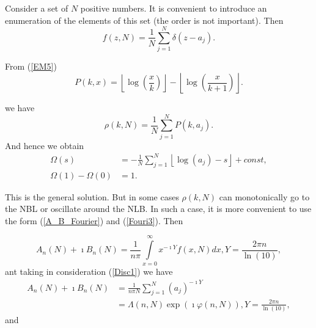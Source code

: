 \documentclass[titlepage,fleqn]{article}%
\begin{document}
Consider a set of $N$ positive numbers. It is convenient to introduce an
enumeration of the elements of this set (the order is not important). Then%
\begin{equation}
f(z,N)=\frac{1}{N}%
{\displaystyle\sum\limits_{j=1}^{N}}
\delta\left(  z-a_{j}\right)  . \label{Disc1}%
\end{equation}


From (\ref{EM5})%
\begin{equation}
P(k,x)=\left\lfloor \log\left(  \frac{x}{k}\right)  \right\rfloor
-\left\lfloor \log\left(  \frac{x}{k+1}\right)  \right\rfloor . \label{DiscP}%
\end{equation}


\noindent we have%
\[
\rho(k,N)=\frac{1}{N}%
{\displaystyle\sum\limits_{j=1}^{N}}
P(k,a_{j}).
\]
And hence we obtain%
\begin{align}
\Omega(s)  &  =-\frac{1}{N}%
{\displaystyle\sum\limits_{j=1}^{N}}
\left\lfloor \log\left(  a_{j}\right)  -s\right\rfloor
+const,\label{OmegaDisc}\\
\Omega(1)-\Omega(0)  &  =1.
\end{align}


This is the general solution. But in some cases $\rho(k,N)$ can monotonically
go to the NBL or oscillate around the NLB. In such a case, it is more
convenient to use the form (\ref{A_B_Fourier}) and (\ref{Fouri3}). Then%

\begin{equation}
A_{n}(N)+\imath B_{n}(N)=\frac{1}{n\pi}%
{\displaystyle\int\limits_{x=0}^{\infty}}
x^{-\imath Y}f(x,N)dx,Y=\frac{2\pi n}{\ln(10)},\nonumber
\end{equation}
ant taking in consideration (\ref{Disc1}) we have%
\begin{align}
A_{n}(N)+\imath B_{n}(N)  &  =\frac{1}{n\pi N}%
{\displaystyle\sum\limits_{j=1}^{N}}
(a_{j})^{-\imath Y}\label{Disc3a}\\
&  =\Lambda(n,N)\exp(\imath\varphi(n,N)),Y=\frac{2\pi n}{\ln(10)},
\end{align}
and%
\end{document}
